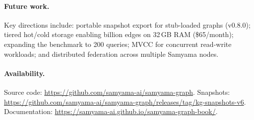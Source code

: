 \documentclass[11pt]{article}
\begin{document}
\paragraph{Future work.} Key directions include: portable snapshot export for stub-loaded graphs (v0.8.0); tiered hot/cold storage enabling billion edges on 32\,GB RAM (\$65/month); expanding the benchmark to 200 queries; MVCC for concurrent read-write workloads; and distributed federation across multiple Samyama nodes.

\paragraph{Availability.} Source code: \url{https://github.com/samyama-ai/samyama-graph}. Snapshots: \url{https://github.com/samyama-ai/samyama-graph/releases/tag/kg-snapshots-v6}. Documentation: \url{https://samyama-ai.github.io/samyama-graph-book/}.



\end{document}
